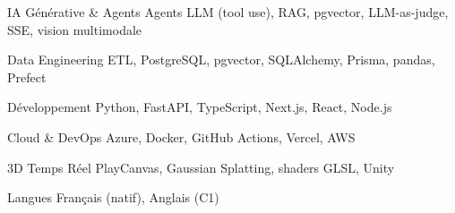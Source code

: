 


\begin{cvskills}


\cvskill
{IA Générative \& Agents}
{Agents LLM (tool use), RAG, pgvector, LLM-as-judge, SSE, vision multimodale}


\cvskill
{Data Engineering}
{ETL, PostgreSQL, pgvector, SQLAlchemy, Prisma, pandas, Prefect}


\cvskill
{Développement}
{Python, FastAPI, TypeScript, Next.js, React, Node.js}


\cvskill
{Cloud \& DevOps}
{Azure, Docker, GitHub Actions, Vercel, AWS}


\cvskill
{3D Temps Réel}
{PlayCanvas, Gaussian Splatting, shaders GLSL, Unity}


\cvskill
{Langues}
{Français (natif), Anglais (C1)}


\end{cvskills}
